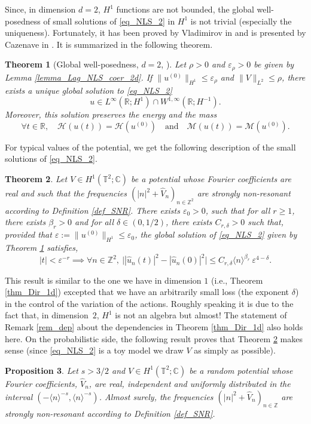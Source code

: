 \documentclass[11pt]{article}
\newcommand{\ie}{i.e.,\xspace}
\let\epsilon\varepsilon
\newtheorem{theorem}{Theorem}[section]
\newtheorem{proposition}[theorem]{Proposition}
\theoremstyle{definition}
\begin{document}
Since, in dimension $d=2$, $H^1$ functions are not bounded, the global well-posedness of small solutions of \eqref{eq_NLS_2} in $H^1$ is not trivial (especially the uniqueness). Fortunately, it has been proved by Vladimirov in \cite{Vla84} and is presented by Cazenave in \cite[Th.\,3.6.1, p.\,78]{Caz03}. It is summarized in the following theorem.
\begin{theorem}[Global well-posedness, $d=2$, \cite{Vla84}]
\label{thm_GWP_NLS_2d} Let $\rho >0$ and $\varepsilon_{\rho}>0$ be given by Lemma \ref{lemma_Lag_NLS_coer_2d}. If $\|u^{(0)} \|_{H^1} \leq \varepsilon_{\rho}$ and $\| V\|_{L^2} \leq \rho$, there exists a unique global solution to \eqref{eq_NLS_2}
\[
u \in L^\infty(\mathbb{R}; H^1) \cap W^{1,\infty}(\mathbb{R};H^{-1}).
\]
Moreover, this solution preserves the energy and the mass
\[
\forall t\in \mathbb{R}, \quad \mathcal{H}(u(t)) = \mathcal{H}(u^{(0)}) \quad \text{and} \quad \mathcal{M}(u(t)) = \mathcal{M}(u^{(0)}).
\]
\end{theorem}

For typical values of the potential, we get the following description of the small solutions of \eqref{eq_NLS_2}.
\begin{theorem}
\label{thm_per_2d}
Let $V\in H^1(\mathbb T^2;\mathbb{C})$ be a potential whose Fourier coefficients are real and such that the frequencies $(|n|^2+\widehat{V}_n)_{n\in \mathbb{Z}^2}$ are strongly non-resonant according to Definition \ref{def_SNR}. There exists $\epsilon_0>0$, such that for all $r\geq 1$, there exists $\beta_r>0$ and for all $\delta \in (0,1/2)$, there exists $C_{r,\delta}>0$ such that, provided that $\varepsilon:= \| u^{(0)} \|_{H^1} \leq \epsilon_{0}$,
the global solution of \eqref{eq_NLS_2} given by Theorem \ref{thm_GWP_NLS_2d} satisfies,
\[
|t|< \varepsilon^{-r} \implies \forall n \in \mathbb{Z}^2, \ \big| |\widehat{u}_{n}(t)|^2 - |\widehat{u}_{n}(0)|^2 \big| \leq C_{r,\delta} \langle n \rangle^{\beta_r} \ \varepsilon^{4-\delta}.
\]
\end{theorem}
This result is similar to the one we have in dimension $1$ (\ie Theorem \ref{thm_Dir_1d}) excepted that we have an arbitrarily small loss (the exponent $\delta$) in the control of the variation of the actions. Roughly speaking it is due to the fact that, in dimension~$2$, $H^1$ is not an algebra but almost! The statement of Remark \eqref{rem_dep} about the dependencies in Theorem \ref{thm_Dir_1d} also holds here. On the probabilistic side, the following result proves that Theorem \ref{thm_per_2d} makes sense (since \eqref{eq_NLS_2} is a toy model we draw $V$ as simply as possible).
\begin{proposition}
\label{prop_proba_dir_2d}
Let $s>3/2$ and $V \in H^1(\mathbb T^2;\mathbb{C})$ be a random potential whose Fourier coefficients, $\widehat{V}_n$, are real, independent and uniformly distributed in the interval $(-\langle n \rangle^{-s},\langle n \rangle^{-s})$. Almost surely, the frequencies $(|n|^2+\widehat{V}_n)_{n\in \mathbb{Z}}$ are strongly non-resonant according to Definition \ref{def_SNR}.
\end{proposition}
\end{document}
